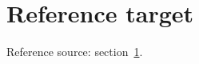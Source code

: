 \documentclass{article}
\begin{document}
\section{Reference target}\label{target}Reference source: section~\ref{target}.
\end{document}
